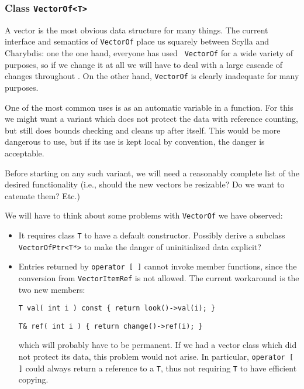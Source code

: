 \subsubsection{Class {\tt VectorOf<T>}}

A vector is the most obvious data structure for many things. The
current interface and semantics of {\tt VectorOf} place us squarely
between Scylla and Charybdis: one the one hand, everyone has used {\tt
VectorOf} for a wide variety of purposes, so if we change it at all we
will have to deal with a large cascade of changes throughout \magnus.
On the other hand, {\tt VectorOf} is clearly inadequate for many
purposes.

One of the most common uses is as an automatic variable in a function.
For this we might want a variant which does not protect the data with
reference counting, but still does bounds checking and cleans up after
itself. This would be more dangerous to use, but if its use is kept
local by convention, the danger is acceptable.

Before starting on any such variant, we will need a reasonably
complete list of the desired functionality (i.e., should the new
vectors be resizable? Do we want to catenate them? Etc.)

We will have to think about some problems with {\tt VectorOf} we have
observed:

\begin{itemize}

\item
It requires class {\tt T} to have a default constructor. Possibly
derive a subclass {\tt VectorOfPtr<T*>} to make the danger of
uninitialized data explicit?

\item
Entries returned by {\tt operator [ ]} cannot invoke member functions,
since the conversion from {\tt VectorItemRef} is not allowed. The
current workaround is the two new members:

  {\tt T val( int i ) const \{ return look()->val(i); \}}

  {\tt T\& ref( int i ) \{ return change()->ref(i); \}}

which will probably have to be permanent. If we had a vector class
which did not protect its data, this problem would not arise. In
particular, {\tt operator [ ]} could always return a reference to a
{\tt T}, thus not requiring {\tt T} to have efficient copying.


\end{itemize}


